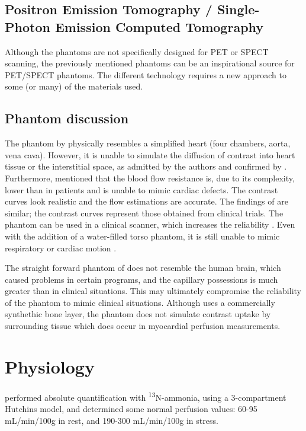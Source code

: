\subsection{Positron Emission Tomography / Single-Photon Emission Computed Tomography}
Although the phantoms are not specifically designed for \ac{PET} or \ac{SPECT} scanning, the previously mentioned phantoms can be an inspirational source for \ac{PET}/\ac{SPECT} phantoms. The different technology requires a new approach to some (or many) of the materials used.

\subsection{Phantom discussion}
The phantom by \cite{chiribiri2013perfusion} physically resembles a simplified heart (four chambers, aorta, vena cava). However, it is unable to simulate the diffusion of contrast into heart tissue or the interstitial space, as admitted by the authors and confirmed by \cite{otton2013direct, o2017effect}. Furthermore, \cite{chiribiri2013perfusion} mentioned that the blood flow resistance is, due to its complexity, lower than in patients and is unable to mimic cardiac defects. The contrast curves look realistic and the flow estimations are accurate. The findings of \cite{otton2013direct} are similar; the contrast curves represent those obtained from clinical trials. The phantom can be used in a clinical  scanner, which increases the reliability . Even with the addition of a water-filled torso phantom, it is still unable to mimic respiratory or cardiac motion \citep{o2017feasibility}.

The straight forward phantom of \cite{suzuki2017quantitative} does not resemble the human brain, which caused problems in certain programs, and the capillary possessions is much greater than in clinical situations. This may ultimately compromise the reliability of the phantom to mimic clinical situations. Although \cite{hashimoto2018effect} uses a commercially synthethic bone layer, the phantom does not simulate contrast uptake by surrounding tissue which does occur in myocardial perfusion measurements.

\section{Physiology}
\cite{slart2015Pres} performed absolute quantification with \textsuperscript{13}N-ammonia, using a 3-compartment Hutchins model, and determined some normal perfusion values: 60-95 mL/min/100g in rest, and 190-300 mL/min/100g in stress.

